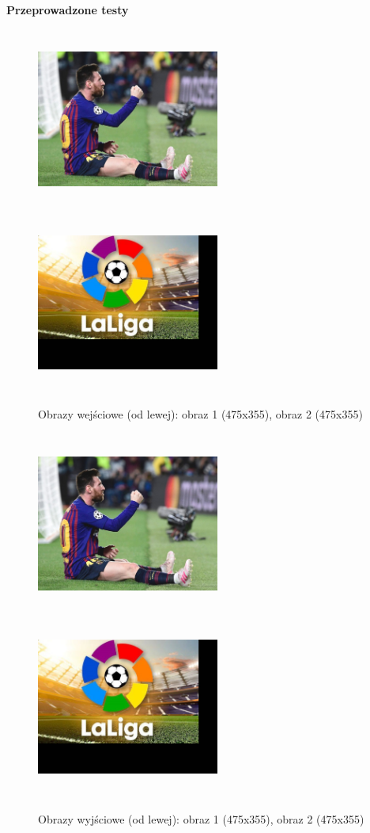 \documentclass[magisterska,openany]{pracadypl}
\begin{document}
\newpage
\vspace{0.25cm}\textbf{\Large Przeprowadzone testy}
\vspace{0.5cm}
\begin{figure}[h]
\centering
\includegraphics[width=6cm, height=6cm]{2_3/GeoRGB1.jpg}
\includegraphics[width=6cm, height=6cm]{2_3/GeoRGB2.jpg}
\caption{Obrazy wejściowe (od lewej): obraz 1 (475x355), obraz 2 (475x355) }
\end{figure}
\begin{figure}[h]
\centering
\includegraphics[width=6cm, height=6cm]{2_4/ResolRGB1.jpg}
\includegraphics[width=6cm, height=6cm]{2_4/ResolRGB2.jpg}
\caption{Obrazy wyjściowe (od lewej): obraz 1 (475x355), obraz 2 (475x355) }
\end{figure}
\end{document}
